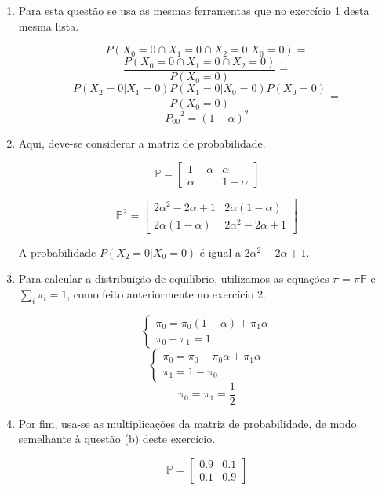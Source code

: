 \documentclass{article}
\begin{document}
\begin{enumerate}[label=(\alph*)]
    \item Para esta questão se usa as mesmas ferramentas que no exercício 1 desta mesma lista.
    
    $$P(X_0=0\cap X_1=0\cap X_2=0|X_0=0) =$$
    $$\frac{P(X_0=0\cap X_1=0\cap X_2=0)}{P(X_0=0)} =$$
    $$\frac{P(X_2=0|X_1=0)P(X_1=0|X_0=0)P(X_0=0)}{P(X_0=0)} =$$
    $${P_{00}}^2 = (1-\alpha)^2$$
    
    \item Aqui, deve-se considerar a matriz de probabilidade.
    
    $$\mathbb{P}=\begin{bmatrix}
        1-\alpha & \alpha\\
        \alpha & 1-\alpha
    \end{bmatrix}$$
    
    $$\mathbb{P}^2=\begin{bmatrix}
        2\alpha^2-2\alpha+1 & 2\alpha(1-\alpha)\\
        2\alpha(1-\alpha) & 2\alpha^2-2\alpha+1
    \end{bmatrix}$$
    
    A probabilidade $P(X_2=0|X_0=0)$ é igual a $2\alpha^2-2\alpha+1$.
    
    \item Para calcular a distribuição de equilíbrio, utilizamos as equações $\pi=\pi\mathbb{P}$ e $\sum_i{\pi_i}=1$, como feito anteriormente no exercício 2.
    
    $$\begin{cases}
      \pi_0=\pi_0(1-\alpha) + \pi_1\alpha\\
      \pi_0+\pi_1=1
    \end{cases}$$
    $$\begin{cases}
      \pi_0=\pi_0 - \pi_0\alpha + \pi_1\alpha\\
      \pi_1=1-\pi_0
    \end{cases}$$
    $$\pi_0=\pi_1=\frac{1}{2}$$
    
    \newpage
    
    \item Por fim, usa-se as multiplicações da matriz de probabilidade, de modo semelhante à questão (b) deste exercício.
    
    $$\mathbb{P}=\begin{bmatrix}
        0.9 & 0.1\\
        0.1 & 0.9
    \end{bmatrix}$$
    

\end{enumerate}
\end{document}
